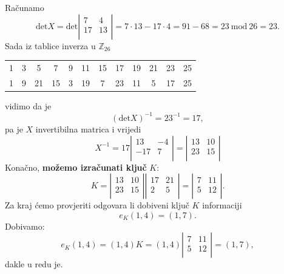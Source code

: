 \documentclass[a4paper,12pt,oneside]{article}
\begin{document}
Računamo
$$\text{det}X = \text{det}\left|\begin{matrix} 7 & 4 \\
	17 & 13 \\ \end{matrix}\right| = 7 \cdot 13 - 17 \cdot 4 = 91 - 68 = 23 \ \text{mod} \ 26  = 23.$$
Sada iz tablice inverza u $\mathbb{Z}_{26}$
\begin{table}[h!]
\begin{tabular}{cccccccccccc}
	1 & 3 & 5 & 7 & 9 & 11 & 15 & 17 & 19 & 21 &
	23 & 25  \\
	1 & 9 & 21 & 15 & 3 & 19 & 7 & 23 & 11 & 5 &
	17 & 25  \\
\end{tabular}
\end{table}


\noindent vidimo da je 
$$(\text{det}X)^{-1} = 23^{-1} = 17,$$
pa je $X$ invertibilna matrica i vrijedi
$$X^{-1} = 17\left|\begin{matrix} 13 & -4 \\
	-17 & 7 \\ \end{matrix}\right| = \left|\begin{matrix} 13 & 10 \\
	23 & 15 \\ \end{matrix}\right|$$
Konačno, \textbf{možemo izračunati ključ} $K$:
$$K = \left|\begin{matrix} 13 & 10 \\
	23 & 15 \\ \end{matrix}\right|\left|\begin{matrix} 17 & 21 \\
	2 & 5 \\ \end{matrix}\right| = \left|\begin{matrix} 7 & 11 \\
	5 & 12 \\ \end{matrix}\right|.$$
Za kraj ćemo provjeriti odgovara li dobiveni ključ $K$ informaciji
$$e_K(1, 4) = (1, 7).$$
Dobivamo:
$$e_K(1, 4) = (1, 4)K = (1, 4)\left|\begin{matrix} 7 & 11 \\
	5 & 12 \\ \end{matrix}\right|  =  (1, 7),$$
dakle u redu je.
\end{document}
